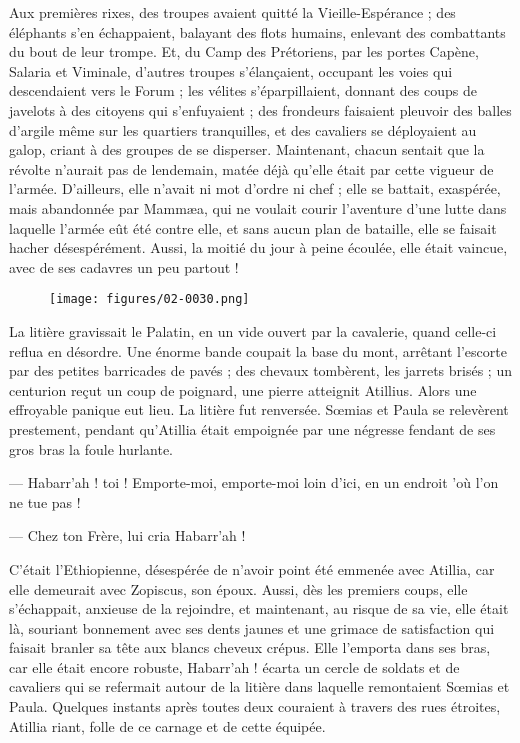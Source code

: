 \documentclass[a4paper, 11pt, oneside, polutonikogreek, french]{article}
\begin{document}
Aux premières rixes, des troupes avaient quitté la Vieille-Espérance ; des éléphants s'en échappaient, balayant des flots humains, enlevant des combattants du bout de leur trompe. Et, du Camp des Prétoriens, par les portes Capène, Salaria et Viminale, d'autres troupes s'élançaient, occupant les voies qui descendaient vers le Forum ; les vélites s'éparpillaient, donnant des coups de javelots à des citoyens qui s'enfuyaient ; des frondeurs faisaient pleuvoir des balles d'argile même sur les quartiers tranquilles, et des cavaliers se déployaient au galop, criant à des groupes de se disperser. Maintenant, chacun sentait que la révolte n'aurait pas de lendemain, matée déjà qu'elle était par cette vigueur de l'armée. D'ailleurs, elle n'avait ni mot d'ordre ni chef ; elle se battait, exaspérée, mais abandonnée par Mammæa, qui ne voulait courir l'aventure d’une lutte dans laquelle l'armée eût été contre elle, et sans aucun plan de bataille, elle se faisait hacher désespérément. Aussi, la moitié du jour à peine écoulée, elle était vaincue, avec de ses cadavres un peu partout !
\begin{figure}[H]
\centering
\texttt{[image: figures/02-0030.png]}
\end{figure}
La litière gravissait le Palatin, en un vide ouvert par la cavalerie, quand celle-ci reflua en désordre. Une énorme bande coupait la base du mont, arrêtant l'escorte par des petites barricades de pavés ; des chevaux tombèrent, les jarrets brisés ; un centurion reçut un coup de poignard, une pierre atteignit Atillius. Alors une effroyable panique eut lieu. La litière fut renversée. Sœmias et Paula se relevèrent prestement, pendant qu'Atillia était empoignée par une négresse fendant de ses gros bras la foule hurlante.

--- Habarr'ah ! toi ! Emporte-moi, emporte-moi loin d'ici, en un endroit 'où l'on ne tue pas !

--- Chez ton Frère, lui cria Habarr'ah !

C'était l'Ethiopienne, désespérée de n'avoir point été emmenée avec Atillia, car elle demeurait avec Zopiscus, son époux. Aussi, dès les premiers coups, elle s'échappait, anxieuse de la rejoindre, et maintenant, au risque de sa vie, elle était là, souriant bonnement avec ses dents jaunes et une grimace de satisfaction qui faisait branler sa tête aux blancs cheveux crépus. Elle l'emporta dans ses bras, car elle était encore robuste, Habarr'ah ! écarta un cercle de soldats et de cavaliers qui se refermait autour de la litière dans laquelle remontaient Sœmias et Paula. Quelques instants après toutes deux couraient à travers des rues étroites, Atillia riant, folle de ce carnage et de cette équipée.
\end{document}
